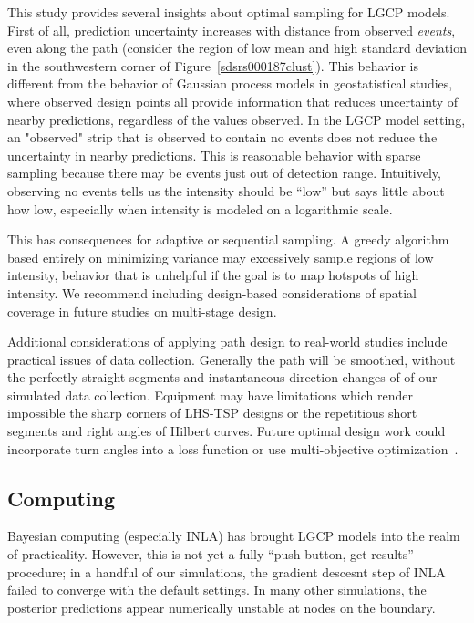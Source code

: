 \documentclass[review]{elsarticle}
\begin{document}
This study provides several insights about optimal sampling for LGCP models.
First of all, prediction uncertainty increases with distance from observed
\emph{events}, even along the path (consider the region of low mean and high
standard deviation in the southwestern corner of
Figure~\ref{sdsrs000187clust}). This behavior is different from the behavior
of Gaussian process models in geostatistical studies, where observed design
points all provide information that reduces uncertainty of nearby predictions,
regardless of the values observed. In the LGCP model setting, an "observed"
strip that is observed to contain no events does not reduce the uncertainty in
nearby predictions. This is reasonable behavior with sparse sampling because
there may be events just out of detection range. Intuitively, observing no
events tells us the intensity should be ``low'' but says little about how low,
especially when intensity is modeled on a logarithmic scale.

This has consequences for adaptive or sequential sampling. A greedy algorithm
based entirely on minimizing variance may excessively sample regions of low
intensity, behavior that is unhelpful if the goal is to map hotspots of high
intensity. We recommend including design-based considerations of spatial
coverage in future studies on multi-stage design.

Additional considerations of applying path design to real-world studies include
practical issues of data collection. Generally the path will be smoothed,
without the perfectly-straight segments and instantaneous direction changes of
of our simulated data collection. Equipment may have limitations which render
impossible the sharp corners of LHS-TSP designs or the repetitious short
segments and right angles of Hilbert curves. Future optimal design work could
incorporate turn angles into a loss function or use multi-objective
optimization~\citep{lark}.



\subsection{Computing}

Bayesian computing (especially INLA) has brought LGCP models into the realm of
practicality. However, this is not yet a fully ``push button, get results''
procedure; in a handful of our simulations, the gradient descesnt step of INLA
failed to converge with the default settings. In many other simulations, the
posterior predictions appear numerically unstable at nodes on the boundary.
\end{document}
